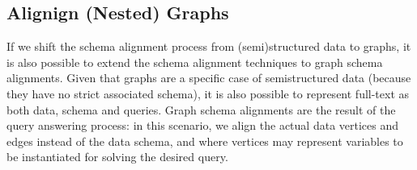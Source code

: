 \subsection{Alignign (Nested) Graphs}\label{sss:ngdi}
If we shift the schema alignment process from (semi)structured data to graphs, it is also possible to extend the schema alignment techniques to graph schema alignments. Given that graphs are a specific case of semistructured data (because they have no strict associated schema), it is also possible to represent full-text as both data, schema and queries. Graph schema alignments are the result of the query answering process: in this scenario, we align the actual data vertices and edges instead of the data schema, and where vertices may represent variables to be instantiated for solving the desired query.

